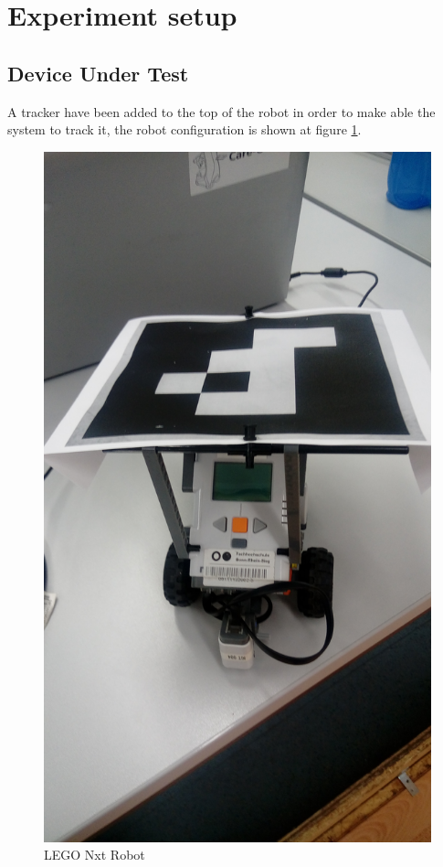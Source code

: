 \documentclass[10pt]{scrartcl}
\begin{document}
\section*{Experiment setup}

\subsection*{Device Under Test}

A tracker have been added to the top of the robot in order to make able the system to track it, the robot configuration is shown at figure \ref{fig:1}.

\begin{figure}[ht!]
\centering
\includegraphics[angle=-90,scale=0.05]{images/robotWithMarker}
\caption{LEGO Nxt Robot}
\label{fig:1}
\end{figure}
\end{document}
